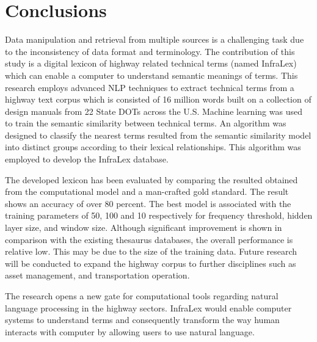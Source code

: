 \documentclass[Journal, InsideFigs, DoubleSpace]{ascelike} %
\begin{document}
\section{Conclusions} \label{sec:conclns3} 
Data manipulation and retrieval from multiple sources is a challenging task due to the inconsistency of data format and terminology. The contribution of this study is a digital lexicon of highway related technical terms (named InfraLex) which can enable a computer to understand semantic meanings of terms.  This research employs advanced NLP techniques to extract technical terms from a highway text corpus which is consisted of 16 million words built on a collection of design manuals from 22 State DOTs across the U.S. Machine learning was used to train the semantic similarity between technical terms. An algorithm was designed to classify the nearest terms resulted from the semantic similarity model into distinct groups according to their lexical relationships. This algorithm was employed to develop the InfraLex database. 
\par
The developed lexicon has been evaluated by comparing the resulted obtained from the computational model and a man-crafted gold standard. The result shows an accuracy of over 80 percent.  The best model is associated with the training parameters of 50, 100 and 10 respectively for frequency threshold, hidden layer size, and window size. Although significant improvement is shown in comparison with the existing thesaurus databases, the overall performance is relative low. This may be due to the size of the training data. Future research will be conducted to expand the highway corpus to further disciplines such as asset management, and transportation operation. 
\par
The research opens a new gate for computational tools regarding natural language processing in the highway sectors. InfraLex would enable computer systems to understand terms and consequently transform the way human interacts with computer by allowing users to use natural language. 


%
%
%
\end{document}
